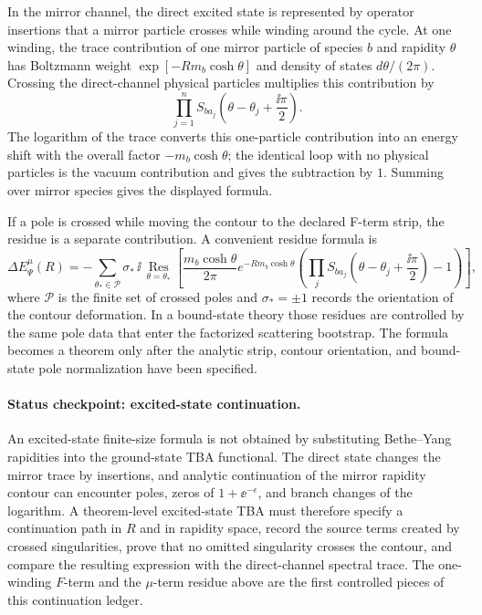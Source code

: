 In the mirror channel, the direct excited state is represented by operator
insertions that a mirror particle crosses while winding around the cycle.  At
one winding, the trace contribution of one mirror particle of species \(b\)
and rapidity \(\theta\) has Boltzmann weight
\(\exp[-Rm_b\cosh\theta]\) and density of states \(d\theta/(2\pi)\).  Crossing
the direct-channel physical particles multiplies this contribution by
\[
  \prod_{j=1}^{n}
  S_{b a_j}\!\left(\theta-\theta_j+\frac{\ii\pi}{2}\right).
\]
The logarithm of the trace converts this one-particle contribution into an
energy shift with the overall factor \(-m_b\cosh\theta\); the identical loop
with no physical particles is the vacuum contribution and gives the
subtraction by \(1\).  Summing over mirror species gives the displayed
formula.

If a pole is crossed while moving the contour to the declared F-term strip,
the residue is a separate contribution.  A convenient residue formula is
\[
  \Delta E_{\Psi}^{\mu}(R)
  =
  -\sum_{\theta_*\in\mathcal P}
  \sigma_*\,
  \ii\,\operatorname*{Res}_{\theta=\theta_*}
  \left[
  \frac{m_b\cosh\theta}{2\pi}
  e^{-Rm_b\cosh\theta}
  \left(
  \prod_j
  S_{b a_j}\!\left(\theta-\theta_j+\frac{\ii\pi}{2}\right)
  -1
  \right)
  \right],
\]
where \(\mathcal P\) is the finite set of crossed poles and
\(\sigma_*=\pm1\) records the orientation of the contour deformation.  In a
bound-state theory those residues are controlled by the same pole data that
enter the factorized scattering bootstrap.  The formula becomes a theorem
only after the analytic strip, contour orientation, and bound-state pole
normalization have been specified.

\paragraph{Status checkpoint: excited-state continuation.}
An excited-state finite-size formula is not obtained by substituting
Bethe--Yang rapidities into the ground-state TBA functional.  The direct
state changes the mirror trace by insertions, and analytic continuation of the
mirror rapidity contour can encounter poles, zeros of \(1+\ee^{-\epsilon}\),
and branch changes of the logarithm.  A theorem-level excited-state TBA must
therefore specify a continuation path in \(R\) and in rapidity space, record
the source terms created by crossed singularities, prove that no omitted
singularity crosses the contour, and compare the resulting expression with
the direct-channel spectral trace.  The one-winding \(F\)-term and the
\(\mu\)-term residue above are the first controlled pieces of this
continuation ledger.

